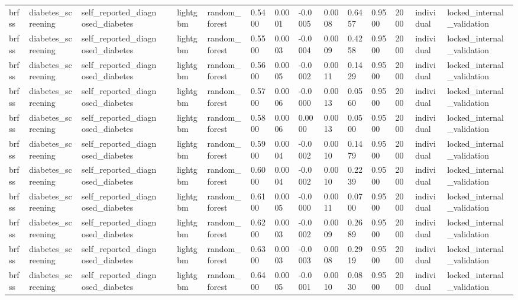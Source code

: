 \begin{tabular}{lllllllllllllll}
brfss & diabetes\_screening & self\_reported\_diagnosed\_diabetes &  & lightgbm & random\_forest & 0.5400 & 0.0001 & -0.0005 & 0.0008 & 0.6457 & 0.9500 & 2000 & individual & locked\_internal\_validation \\
brfss & diabetes\_screening & self\_reported\_diagnosed\_diabetes &  & lightgbm & random\_forest & 0.5500 & 0.0003 & -0.0004 & 0.0009 & 0.4258 & 0.9500 & 2000 & individual & locked\_internal\_validation \\
brfss & diabetes\_screening & self\_reported\_diagnosed\_diabetes &  & lightgbm & random\_forest & 0.5600 & 0.0005 & -0.0002 & 0.0011 & 0.1429 & 0.9500 & 2000 & individual & locked\_internal\_validation \\
brfss & diabetes\_screening & self\_reported\_diagnosed\_diabetes &  & lightgbm & random\_forest & 0.5700 & 0.0006 & -0.0000 & 0.0013 & 0.0560 & 0.9500 & 2000 & individual & locked\_internal\_validation \\
brfss & diabetes\_screening & self\_reported\_diagnosed\_diabetes &  & lightgbm & random\_forest & 0.5800 & 0.0006 & 0.0000 & 0.0013 & 0.0500 & 0.9500 & 2000 & individual & locked\_internal\_validation \\
brfss & diabetes\_screening & self\_reported\_diagnosed\_diabetes &  & lightgbm & random\_forest & 0.5900 & 0.0004 & -0.0002 & 0.0010 & 0.1479 & 0.9500 & 2000 & individual & locked\_internal\_validation \\
brfss & diabetes\_screening & self\_reported\_diagnosed\_diabetes &  & lightgbm & random\_forest & 0.6000 & 0.0004 & -0.0002 & 0.0010 & 0.2239 & 0.9500 & 2000 & individual & locked\_internal\_validation \\
brfss & diabetes\_screening & self\_reported\_diagnosed\_diabetes &  & lightgbm & random\_forest & 0.6100 & 0.0005 & -0.0000 & 0.0011 & 0.0700 & 0.9500 & 2000 & individual & locked\_internal\_validation \\
brfss & diabetes\_screening & self\_reported\_diagnosed\_diabetes &  & lightgbm & random\_forest & 0.6200 & 0.0003 & -0.0002 & 0.0009 & 0.2689 & 0.9500 & 2000 & individual & locked\_internal\_validation \\
brfss & diabetes\_screening & self\_reported\_diagnosed\_diabetes &  & lightgbm & random\_forest & 0.6300 & 0.0003 & -0.0003 & 0.0008 & 0.2919 & 0.9500 & 2000 & individual & locked\_internal\_validation \\
brfss & diabetes\_screening & self\_reported\_diagnosed\_diabetes &  & lightgbm & random\_forest & 0.6400 & 0.0005 & -0.0001 & 0.0010 & 0.0830 & 0.9500 & 2000 & individual & locked\_internal\_validation \\

\end{tabular}
